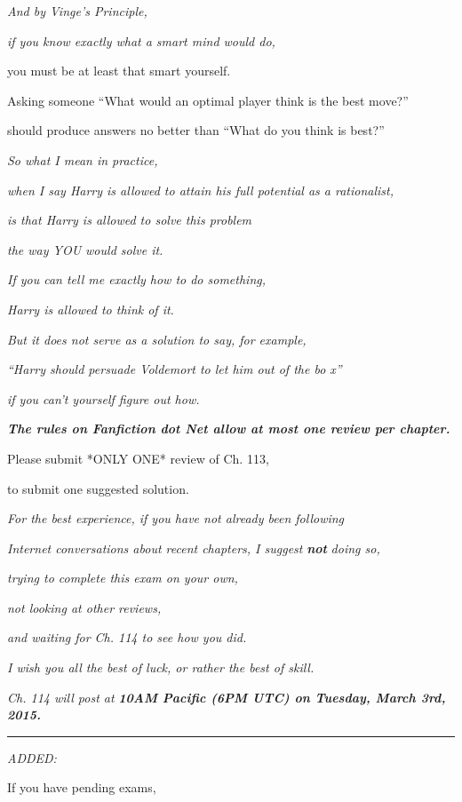 \emph{And by Vinge's Principle,}

\emph{if you know exactly what a smart mind would do,}

you must be at least that smart yourself.

Asking someone ``What would an optimal player think is the best move?''

should produce answers no better than ``What do you think is best?''

\emph{So what I mean in practice,}

\emph{when I say Harry is allowed to attain his full potential as a rationalist,}

\emph{is that Harry is allowed to solve this problem}

\emph{the way YOU would solve it.}

\emph{If you can tell me exactly how to do something,}

\emph{Harry is allowed to think of it.}

\emph{But it does not serve as a solution to say, for example,}

\emph{``Harry should persuade Voldemort to let him out of the bo x''}

\emph{if you can't yourself figure out how.}

\emph{\textbf{The rules on Fanfiction dot Net allow at most one review per chapter.}}

Please submit *ONLY ONE* review of Ch. 113,

to submit one suggested solution.

\emph{For the best experience, if you have not already been following}

\emph{Internet conversations about recent chapters, I suggest} \emph{\textbf{not}} \emph{doing so,}

\emph{trying to complete this exam on your own,}

\emph{not looking at other reviews,}

\emph{and waiting for Ch. 114 to see how you did.}

\emph{I wish you all the best of luck, or rather the best of skill.}

\emph{Ch. 114 will post at} \emph{\textbf{10AM Pacific (6PM UTC) on Tuesday, March 3rd, 2015.}}

\begin{center}\rule{3in}{0.4pt}\end{center}

\emph{ADDED:}

If you have pending exams,

